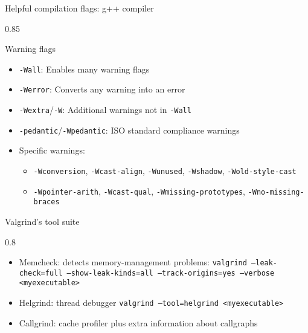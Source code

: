 \documentclass[aspectratio=1610]{beamer}
\newenvironment{centeredblock}[2][0.8\textwidth]
{ %
	\begin{center}
		\begin{varwidth}{#1} %
			\begin{block}{#2}
				\centering
			}
			{ %
			\end{block}
		\end{varwidth}
	\end{center}
}
\begin{document}
	\begin{frame}[fragile]{Helpful compilation flags: g++ compiler}
		\begin{centeredblock}[0.85 \textwidth]{Warning flags}
			\begin{itemize}
				\item \texttt{-Wall}: Enables many warning flags
				\item \texttt{-Werror}: Converts any warning into an error
				\item \texttt{-Wextra}/\texttt{-W}: Additional warnings not in \texttt{-Wall}
				\item \texttt{-pedantic}/\texttt{-Wpedantic}: ISO standard compliance warnings
				\item Specific warnings:
				\begin{itemize}
					\item \texttt{-Wconversion}, \texttt{-Wcast-align}, \texttt{-Wunused}, \texttt{-Wshadow}, \texttt{-Wold-style-cast}
					\item \texttt{-Wpointer-arith}, \texttt{-Wcast-qual}, \texttt{-Wmissing-prototypes}, \texttt{-Wno-missing-braces}
				\end{itemize}
			\end{itemize}
		\end{centeredblock}
	
		{\def\thefootnote{}}
	\end{frame}
	
	\begin{frame}[fragile]{Valgrind's tool suite}
		\begin{centeredblock}{}
			\begin{itemize}
				\item Memcheck: detects memory-management problems: \newline 
					\texttt{valgrind --leak-check=full --show-leak-kinds=all --track-origins=yes --verbose <myexecutable>}
				\item Helgrind: thread debugger \newline
					\texttt{valgrind --tool=helgrind <myexecutable>}
				\item Callgrind: cache profiler plus extra information about callgraphs
			\end{itemize}
		\end{centeredblock}
	\end{frame}
	
\end{document}

